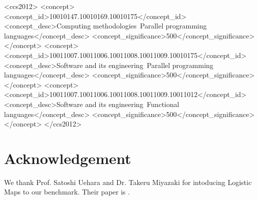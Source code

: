 \documentclass[sigplan,table]{acmart}
\begin{document}
%
%
\begin{CCSXML}
<ccs2012>
<concept>
<concept_id>10010147.10010169.10010175</concept_id>
<concept_desc>Computing methodologies~Parallel programming languages</concept_desc>
<concept_significance>500</concept_significance>
</concept>
<concept>
<concept_id>10011007.10011006.10011008.10011009.10010175</concept_id>
<concept_desc>Software and its engineering~Parallel programming languages</concept_desc>
<concept_significance>500</concept_significance>
</concept>
<concept>
<concept_id>10011007.10011006.10011008.10011009.10011012</concept_id>
<concept_desc>Software and its engineering~Functional languages</concept_desc>
<concept_significance>500</concept_significance>
</concept>
</ccs2012>
\end{CCSXML}




\maketitle



\section*{Acknowledgement}

We thank Prof. Satoshi Uehara and Dr. Takeru Miyazaki for intoducing Logistic Maps to our benchmark. Their paper is \cite{Miyazaki14}.



\end{document}
